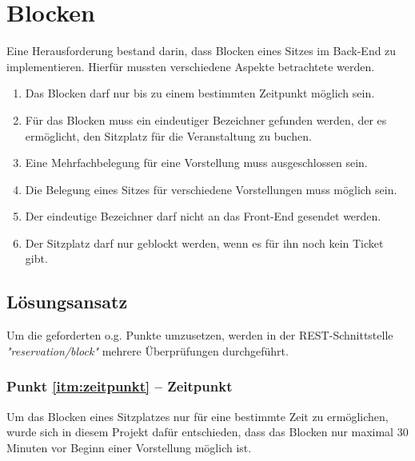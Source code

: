 \section{Blocken}
\label{sec:blocken}
\authorsection{\authorSG}
Eine Herausforderung bestand darin, dass Blocken eines Sitzes im Back-End zu implementieren. Hierfür mussten verschiedene Aspekte betrachtete werden.

\begin{enumerate}
\item \label{itm:zeitpunkt}Das Blocken darf nur bis zu einem bestimmten Zeitpunkt möglich sein.
\item \label{itm:bezeichner}Für das Blocken muss ein eindeutiger Bezeichner gefunden werden, der es ermöglicht, den Sitzplatz für die Veranstaltung zu buchen.
\item \label{itm:mehr_eine_vorstellung}Eine Mehrfachbelegung für eine Vorstellung muss ausgeschlossen sein.
\item \label{itm:mehr_mehrere_vorstellungen}Die Belegung eines Sitzes für verschiedene Vorstellungen muss möglich sein.
\item \label{itm:front_end} Der eindeutige Bezeichner darf nicht an das Front-End gesendet werden.
\item \label{itm:ticket} Der Sitzplatz darf nur geblockt werden, wenn es für ihn noch kein Ticket gibt.
\end{enumerate}

\subsection{Lösungsansatz}
\label{ssec:loesung_blocken}
\authorsection{\authorSG}
Um die geforderten o.g. Punkte umzusetzen, werden in der \acs{REST}-Schnittstelle \textit{"reservation/block"} mehrere Überprüfungen durchgeführt.
  
\subsubsection*{Punkt \ref{itm:zeitpunkt} -- Zeitpunkt}
\label{ssssec:Zeitpunkt}
Um das Blocken eines Sitzplatzes nur für eine bestimmte Zeit zu ermöglichen, wurde sich in diesem Projekt dafür entschieden, dass das Blocken nur maximal 30 Minuten vor Beginn einer Vorstellung möglich ist. 

